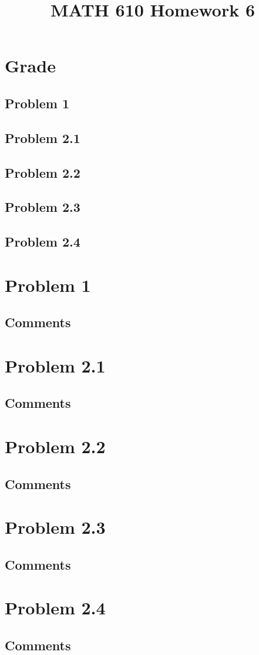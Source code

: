 \documentclass{article}
\title{MATH 610 Homework 6}
\author{
}
\date{}
\newcommand{\problem}[2]{
    \section*{Problem #1}
    {#2}
    \vfill
    \subsection*{Comments}
    \newpage
}
\begin{document}
\maketitle
\newpage

\section*{Grade}
\subsection*{Problem 1}
\subsection*{Problem 2.1}
\subsection*{Problem 2.2}
\subsection*{Problem 2.3}
\subsection*{Problem 2.4}
\newpage

\problem{1}{
}

\problem{2.1}{
}

\problem{2.2}{
}

\problem{2.3}{
}

\problem{2.4}{
}
\end{document}

